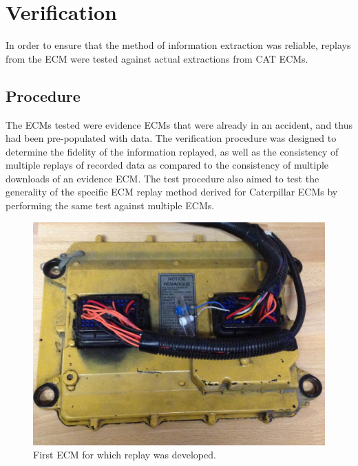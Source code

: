\section{Verification}

In order to ensure that the method of information extraction was reliable, replays from the ECM were tested against
actual extractions from CAT ECMs.

\subsection{Procedure}

The ECMs tested were evidence ECMs that were already in an accident, and thus had been pre-populated with data.
The verification procedure was designed to determine the fidelity of the information replayed, as well as the
consistency of multiple replays of recorded data as compared to the consistency of multiple downloads of an
evidence ECM. The test procedure also aimed to test the generality of the specific ECM replay method derived
for Caterpillar ECMs by performing the same test against multiple ECMs.

\begin{figure}[h]
  \centering
  \includegraphics[scale=.2]{cat-ecm-1}
  \caption{First ECM for which replay was developed.}
  \label{fig:cat-ecm-1}
\end{figure}


